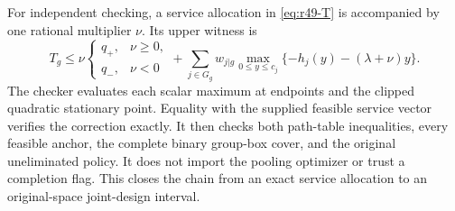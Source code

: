 For independent checking, a service allocation in \eqref{eq:r49-T} is accompanied by one rational multiplier $\nu$. Its upper witness is
\begin{equation}\label{eq:r49-service-dual}
 T_g\leq
 \nu\begin{cases}q_+,&\nu\geq0,\\q_-,&\nu<0\end{cases}
 +\sum_{j\in G_g}w_{j|g}\max_{0\leq y\leq c_j}
        \{-h_j(y)-(\lambda+\nu)y\}.
\end{equation}
The checker evaluates each scalar maximum at endpoints and the clipped quadratic stationary point. Equality with the supplied feasible service vector verifies the correction exactly. It then checks both path-table inequalities, every feasible anchor, the complete binary group-box cover, and the original uneliminated policy. It does not import the pooling optimizer or trust a completion flag. This closes the chain from an exact service allocation to an original-space joint-design interval.
